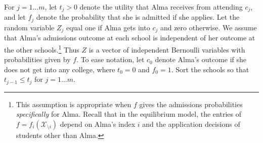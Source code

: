 \documentclass[12pt]{article} %
\theoremstyle{definition}
\theoremstyle{definition}
\begin{document}
For $j=1\dots m$, let $t_j > 0$ denote the utility that Alma receives from attending $c_j$, and let $f_j$ denote the probability that she is admitted if she applies. Let the random variable $Z_j$ equal one if Alma gets into $c_j$ and zero otherwise.  We assume that Alma’s admissions outcome at each school is independent of her outcome at the other schools.\footnote{This assumption is appropriate when $f$ gives the admissions probabilities \emph{specifically} for Alma. Recall that in the equilibrium model, the entries of $f = f_{i}(\mathcal{X}_{\setminus i})$ depend on Alma’s index $i$ and the application decisions of students other than Alma.} Thus $Z$ is a vector of independent Bernoulli variables with probabilities given by $f$. To ease notation, let $c_0$ denote Alma's outcome if she does not get into any college, where $t_0 = 0$ and $f_0 = 1$. Sort the schools so that $t_{j-1} \leq t_j$ for $j=1 \dots m$.
\end{document}
